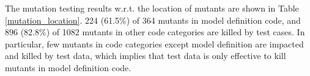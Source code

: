   \begin{table}[!t]
  \begin{center}
  \caption{Mutant Location Results}
  \vspace{-5pt}
    \label{mutation_location}
    \end{center}
    \end{table}

  The mutation testing results w.r.t. the location of mutants are shown in Table \ref{mutation_location}. 224 (61.5\%) of 364 mutants in model definition code, and 896 (82.8\%) of 1082 mutants in other code categories are killed by test cases. 
  In particular, few mutants in code categories except model definition are impacted and killed by test data, which implies that test data is only effective to kill mutants in model definition code.

